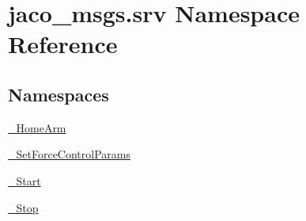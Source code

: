 \hypertarget{namespacejaco__msgs_1_1srv}{}\section{jaco\+\_\+msgs.\+srv Namespace Reference}
\label{namespacejaco__msgs_1_1srv}
\subsection*{Namespaces}
\begin{DoxyCompactItemize}
\item 
 \hyperlink{namespacejaco__msgs_1_1srv_1_1__HomeArm}{\+\_\+\+Home\+Arm}
\item 
 \hyperlink{namespacejaco__msgs_1_1srv_1_1__SetForceControlParams}{\+\_\+\+Set\+Force\+Control\+Params}
\item 
 \hyperlink{namespacejaco__msgs_1_1srv_1_1__Start}{\+\_\+\+Start}
\item 
 \hyperlink{namespacejaco__msgs_1_1srv_1_1__Stop}{\+\_\+\+Stop}
\end{DoxyCompactItemize}
